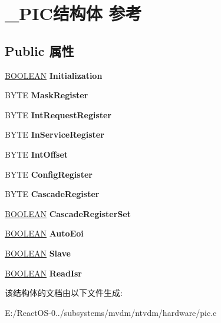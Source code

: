 \hypertarget{struct___p_i_c}{}\section{\+\_\+\+P\+I\+C结构体 参考}
\label{struct___p_i_c}
\subsection*{Public 属性}
\begin{DoxyCompactItemize}
\item 
\mbox{\label{struct___p_i_c_aace0e16127dd48107b679f6d994e1b83}} 
\hyperlink{_processor_bind_8h_a112e3146cb38b6ee95e64d85842e380a}{B\+O\+O\+L\+E\+AN} {\bfseries Initialization}
\item 
\mbox{\label{struct___p_i_c_ab2dc4fad617b7698b81803d8b13ef9c6}} 
B\+Y\+TE {\bfseries Mask\+Register}
\item 
\mbox{\label{struct___p_i_c_a40052e895f6cbe5d0ab871a3d573dc60}} 
B\+Y\+TE {\bfseries Int\+Request\+Register}
\item 
\mbox{\label{struct___p_i_c_a8ba90bbc151d120667e1e2d6c64ed561}} 
B\+Y\+TE {\bfseries In\+Service\+Register}
\item 
\mbox{\label{struct___p_i_c_a2197114ec8ef851fed9737ac6c79ade4}} 
B\+Y\+TE {\bfseries Int\+Offset}
\item 
\mbox{\label{struct___p_i_c_ab79c311446a47f07cb159867adf0aed4}} 
B\+Y\+TE {\bfseries Config\+Register}
\item 
\mbox{\label{struct___p_i_c_a0c7b7b08f1960816521420af03b98129}} 
B\+Y\+TE {\bfseries Cascade\+Register}
\item 
\mbox{\label{struct___p_i_c_a0cdbe8d72449ac492ae0363ee23d8904}} 
\hyperlink{_processor_bind_8h_a112e3146cb38b6ee95e64d85842e380a}{B\+O\+O\+L\+E\+AN} {\bfseries Cascade\+Register\+Set}
\item 
\mbox{\label{struct___p_i_c_a64872d489057a2546464e8f8ec1133a8}} 
\hyperlink{_processor_bind_8h_a112e3146cb38b6ee95e64d85842e380a}{B\+O\+O\+L\+E\+AN} {\bfseries Auto\+Eoi}
\item 
\mbox{\label{struct___p_i_c_a4461d4c439efe13fb7a50494c762c5bb}} 
\hyperlink{_processor_bind_8h_a112e3146cb38b6ee95e64d85842e380a}{B\+O\+O\+L\+E\+AN} {\bfseries Slave}
\item 
\mbox{\label{struct___p_i_c_affd5bf970b6ab9deeb55537fe72baa24}} 
\hyperlink{_processor_bind_8h_a112e3146cb38b6ee95e64d85842e380a}{B\+O\+O\+L\+E\+AN} {\bfseries Read\+Isr}
\end{DoxyCompactItemize}


该结构体的文档由以下文件生成\+:\begin{DoxyCompactItemize}
\item 
E\+:/\+React\+O\+S-\/0../subsystems/mvdm/ntvdm/hardware/pic.\+c\end{DoxyCompactItemize}
